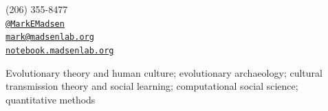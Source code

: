 \documentclass[11pt,article,oneside]{memoir}
\makeatletter
\def\myemail{mark@madsenlab.org}
\def\myweb{notebook.madsenlab.org}
\def\myphone{(206) 355-8477}
\def\mytwitter{@MarkEMadsen}
\makeatother
\begin{document}

\pagestyle{kjh}
\thispagestyle{kjhgit}


\begin{minipage}[t]{2.95in}
  
\end{minipage}
\hfill     
\hfill
\begin{minipage}[t]{1.3in}
  \flushright \footnotesize  \addressblock \myphone \, \faPhone \\ 
  {\scriptsize  \texttt{\href{http://twitter.com/MarkEMadsen}{\mytwitter}} \, \faTwitter }  \\ 
  {\scriptsize  \texttt{\href{mailto:\myemail}{\myemail}} \, \faEnvelope} \\
  {\scriptsize  \texttt{\href{\myweb}{\myweb}} \, \faGlobe}
\end{minipage}

\medskip

\reversemarginpar

\bigskip       



\noindent Evolutionary theory and human culture; evolutionary archaeology; cultural transmission theory and social learning; computational social science; quantitative methods

\bigskip 

\end{document}
